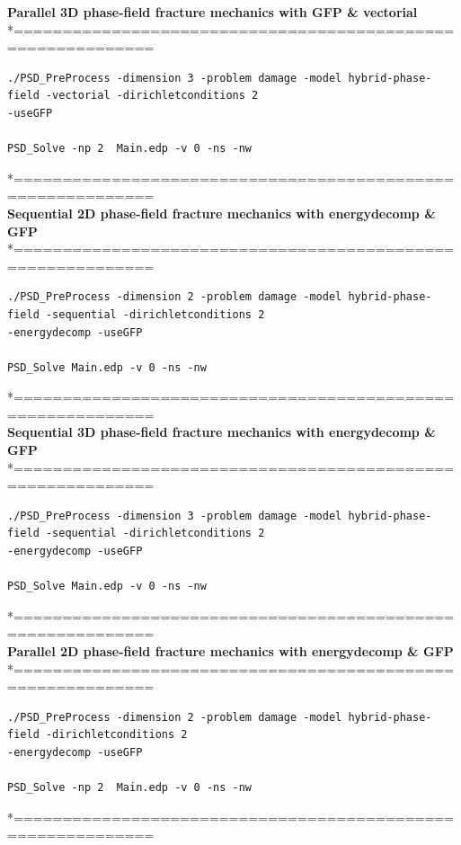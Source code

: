 \textbf{ Parallel 3D phase-field fracture mechanics with GFP \& vectorial }\\
*============================================================\\
\begin{lstlisting}[style=Linux]
./PSD_PreProcess -dimension 3 -problem damage -model hybrid-phase-field -vectorial -dirichletconditions 2 
-useGFP   

PSD_Solve -np 2  Main.edp -v 0 -ns -nw   
\end{lstlisting}
*============================================================\\
 \textbf{Sequential 2D phase-field fracture mechanics with energydecomp \& GFP} \\
*============================================================\\
\begin{lstlisting}[style=Linux]
./PSD_PreProcess -dimension 2 -problem damage -model hybrid-phase-field -sequential -dirichletconditions 2 
-energydecomp -useGFP   

PSD_Solve Main.edp -v 0 -ns -nw   
\end{lstlisting}
*============================================================\\
\textbf{ Sequential 3D phase-field fracture mechanics with energydecomp \& GFP} \\
*============================================================\\
\begin{lstlisting}[style=Linux]
./PSD_PreProcess -dimension 3 -problem damage -model hybrid-phase-field -sequential -dirichletconditions 2 
-energydecomp -useGFP   

PSD_Solve Main.edp -v 0 -ns -nw   
\end{lstlisting}
*============================================================\\
 \textbf{Parallel 2D phase-field fracture mechanics with energydecomp \& GFP} \\
*============================================================\\
\begin{lstlisting}[style=Linux]
./PSD_PreProcess -dimension 2 -problem damage -model hybrid-phase-field -dirichletconditions 2 
-energydecomp -useGFP  

PSD_Solve -np 2  Main.edp -v 0 -ns -nw   
\end{lstlisting}
*============================================================\\
